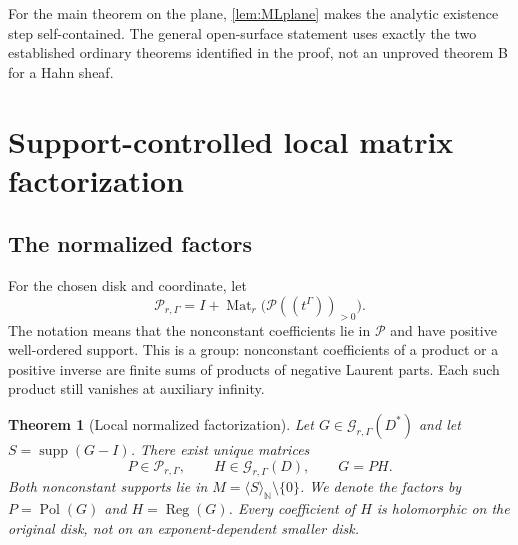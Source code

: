 \documentclass[11pt,letterpaper]{article}
\newtheorem{theorem}{Theorem}[section]
\theoremstyle{definition}
\theoremstyle{remark}
\newcommand{\N}{\mathbb N}
\newcommand{\GG}{\mathscr G_{r,\Gamma}}
\newcommand{\Mat}{\operatorname{Mat}}
\newcommand{\supp}{\operatorname{supp}}
\newcommand{\Pol}{\operatorname{Pol}}
\newcommand{\Reg}{\operatorname{Reg}}
\newcommand{\PP}{\mathcal P}
\newcommand{\angles}[1]{\langle #1\rangle_{\N}}
\numberwithin{equation}{section}
\begin{document}
For the main theorem on the plane, \cref{lem:MLplane} makes the analytic existence step self-contained. The general open-surface statement uses exactly the two established ordinary theorems identified in the proof, not an unproved theorem B for a Hahn sheaf.

\section{Support-controlled local matrix factorization}\label{sec:factorization}

\subsection{The normalized factors}

For the chosen disk and coordinate, let
\[
 \mathscr P_{r,\Gamma}
 =I+\Mat_r\bigl(\PP((t^\Gamma))_{>0}\bigr).
\]
The notation means that the nonconstant coefficients lie in $\PP$ and have positive well-ordered support. This is a group: nonconstant coefficients of a product or a positive inverse are finite sums of products of negative Laurent parts. Each such product still vanishes at auxiliary infinity.

\begin{theorem}[Local normalized factorization]\label{thm:local}
Let $G\in\GG(D^*)$ and let $S=\supp(G-I)$. There exist unique matrices
\begin{equation}\label{eq:localfactor}
 P\in\mathscr P_{r,\Gamma},\qquad H\in\GG(D),
 \qquad G=PH.
\end{equation}
Both nonconstant supports lie in $M=\angles S\setminus\{0\}$. We denote the factors by $P=\Pol(G)$ and $H=\Reg(G)$. Every coefficient of $H$ is holomorphic on the original disk, not on an exponent-dependent smaller disk.
\end{theorem}
\end{document}
